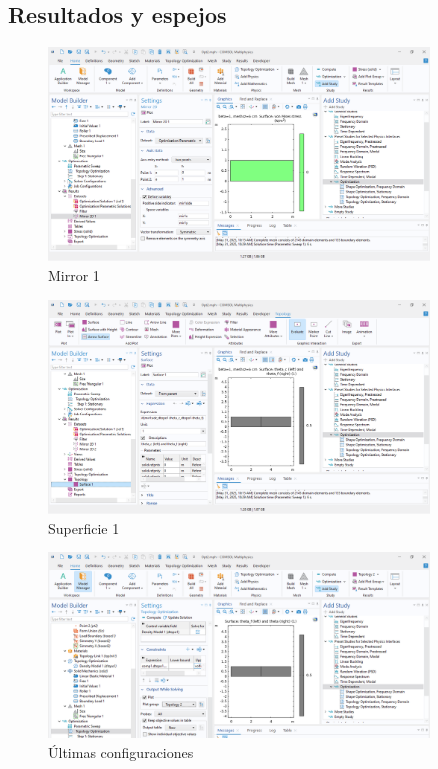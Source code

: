 \documentclass{article}
\theoremstyle{mytheoremstyle}
\theoremstyle{mytheoremstyle}
\theoremstyle{myproblemstyle}
\begin{document}
            \subsection{Resultados y espejos}
             \begin{figure}[H]
              \centering
              \includegraphics[width=0.9\textwidth]{mirror.png}
              \caption{Mirror 1}
              \label{fig:comsol_mirror1}
            \end{figure}

 \begin{figure}[H]
              \centering
              \includegraphics[width=0.9\textwidth]{sup.png}
              \caption{Superficie 1}
              \label{fig:comsol_superficie1}
            \end{figure}

             \begin{figure}[H]
              \centering
              \includegraphics[width=0.9\textwidth]{las.png}
              \caption{Últimas configuraciones}
              \label{fig:comsol_ultimas_config}
            \end{figure}
\end{document}
